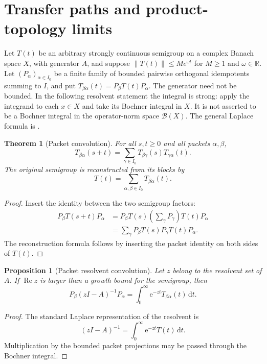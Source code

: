 \documentclass[11pt,letterpaper]{article}
\newtheorem{theorem}{Theorem}[section]
\theoremstyle{plain}
\newtheorem{proposition}[proposition]{Proposition}
\theoremstyle{plain}
\theoremstyle{plain}
\theoremstyle{definition}
\theoremstyle{definition}
\theoremstyle{definition}
\theoremstyle{definition}
\theoremstyle{definition}
\theoremstyle{remark}
\theoremstyle{remark}
\theoremstyle{remark}
\theoremstyle{remark}
\theoremstyle{remark}
\newcommand{\norm}[1]{\left\lVert#1\right\rVert}
\theoremstyle{remark}
\newcommand{\e}{\mathrm e}
\newcommand{\dd}{\,\mathrm d}
\let\KomorebiPrimitiveMathcal\mathcal
\renewcommand{\mathcal}[1]{{\KomorebiPrimitiveMathcal{#1}}}
\let\KomorebiPrimitivemathbb\mathbb
\renewcommand{\mathbb}[1]{{\KomorebiPrimitivemathbb{#1}}}
\let\KomorebiPrimitivemathrm\mathrm
\renewcommand{\mathrm}[1]{{\KomorebiPrimitivemathrm{#1}}}
\begin{document}
\section{Transfer paths and product-topology limits}\label{earlier:section:01}
Let $T(t)$ be an arbitrary strongly continuous semigroup on a complex Banach space $X$, with generator $A$, and suppose $\norm{T(t)}\leq M e^{\omega t}$ for $M\geq1$ and $\omega\in\mathbb R$. Let $(P_\alpha)_{\alpha\in I_0}$ be a finite family of bounded pairwise orthogonal idempotents summing to $I$, and put $T_{\beta\alpha}(t)=P_\beta T(t)P_\alpha$. The generator need not be bounded. In the following resolvent statement the integral is strong: apply the integrand to each $x\in X$ and take its Bochner integral in $X$. It is not asserted to be a Bochner integral in the operator-norm space $\mathcal B(X)$. The general Laplace formula is \cite[Chapter II, Theorem 1.10]{EngelNagel2000}.
\begin{theorem}[Packet convolution]\label{earlier:record:001}\label{earlier:thm:packet_convolution}
For all \(s,t\geq0\) and all packets \(\alpha,\beta\),
\[
\boxed{
T_{\beta\alpha}(s+t)
=
\sum_{\gamma\in I_0}
T_{\beta\gamma}(s)T_{\gamma\alpha}(t).
}
\]
The original semigroup is reconstructed from its blocks by
\[
T(t)=\sum_{\alpha,\beta\in I_0}T_{\beta\alpha}(t).
\]
\end{theorem}

\begin{proof}
Insert the identity between the two semigroup factors:
\[
\begin{aligned}
P_\beta T(s+t)P_\alpha
&=P_\beta T(s)\left(\sum_\gamma P_\gamma\right)T(t)P_\alpha\\
&=\sum_\gamma
P_\beta T(s)P_\gamma T(t)P_\alpha.
\end{aligned}
\]
The reconstruction formula follows by inserting the packet identity on both sides of \(T(t)\).
\end{proof}

\begin{proposition}[Packet resolvent convolution]\label{earlier:record:002}\label{earlier:prop:packet_resolvent}
Let \(z\) belong to the resolvent set of \(A\). If \(\operatorname{Re}z\) is larger than a growth bound for the semigroup, then
\[
P_\beta(zI-A)^{-1}P_\alpha
=
\int_0^{\infty}\e^{-zt}T_{\beta\alpha}(t)\dd t.
\]
\end{proposition}

\begin{proof}
The standard Laplace representation of the resolvent is
\[
(zI-A)^{-1}
=
\int_0^{\infty}\e^{-zt}T(t)\dd t.
\]
Multiplication by the bounded packet projections may be passed through the Bochner integral.
\end{proof}
\end{document}
